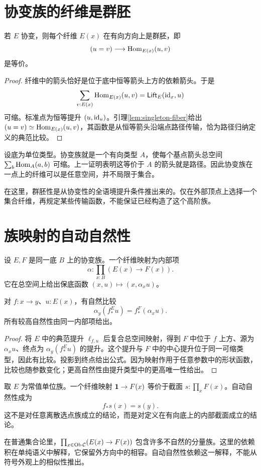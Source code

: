 \section{协变族的纤维是群胚}
\begin{theorem}[纤维群胚性]\label{thm:covariant-groupoid}
若 $E$ 协变，则每个纤维 $E(x)$ 在有向方向上是群胚，即
\[
(u=v)\longrightarrow\operatorname{Hom}_{E(x)}(u,v)
\]
是等价。
\end{theorem}
\begin{proof}
纤维中的箭头恰好是位于底中恒等箭头上方的依赖箭头。于是
\[
\sum_{v:E(x)}\operatorname{Hom}_{E(x)}(u,v)
=\mathsf{Lift}_E(\operatorname{id}_x,u)
\]
可缩。标准点为恒等提升 $(u,\operatorname{id}_u)$。引理\ref{lem:singleton-fiber}给出
$(u=v)\simeq\operatorname{Hom}_{E(x)}(u,v)$，其函数是从恒等箭头沿端点路径传输，恰为路径归纳定义的典范比较。
\end{proof}
\begin{example}
设底为单位类型。协变族就是一个有向类型 $A$，使每个基点箭头总空间 $\sum_b\operatorname{Hom}_A(a,b)$ 可缩。上一证明表明这等价于 $A$ 的箭头就是路径。因此协变族在一点上的纤维可以是任意空间，并不局限于集合。
\end{example}
\begin{remark}
在这里，群胚性是从协变性的全语境提升条件推出来的。仅在外部顶点上选择一个集合纤维，再规定某些传输函数，不能保证已经构造了这个高阶族。
\end{remark}

\section{族映射的自动自然性}
\begin{definition}[纤维映射]
设 $E,F$ 是同一底 $B$ 上的协变族。一个纤维映射为内部项
\[
\alpha:\prod_{x:B}(E(x)\to F(x)).
\]
它在总空间上给出保底函数 $(x,u)\mapsto(x,\alpha_xu)$。
\end{definition}
\begin{theorem}[自动自然性]\label{thm:automatic-naturality}
对 $f:x\to y$、$u:E(x)$，有自然比较
\[
\alpha_y(f_*^E u)=f_*^F(\alpha_xu).
\]
所有较高自然性由同一内部项给出。
\end{theorem}
\begin{proof}
将 $E$ 中的典范提升 $\ell_{f,u}$ 后复合总空间映射，得到 $F$ 中位于 $f$ 上方、源为 $\alpha_xu$、终点为 $\alpha_y(f_*^Eu)$ 的提升。这个提升与 $F$ 中的中心提升位于同一可缩类型，因此有比较。投影到终点给出公式。因为映射作用于任意参数中的形状函数，比较也随参数变化；更高自然性由提升类型中的更高唯一性给出。
\end{proof}
\begin{example}[截面的自然性]
取 $E$ 为常值单位族。一个纤维映射 $\mathbf 1\to F(x)$ 等价于截面 $s:\prod_xF(x)$。自动自然性成为
\[
f_*s(x)=s(y).
\]
这不是对任意离散选点族成立的结论，而是对定义在有向底上的内部截面成立的结论。
\end{example}
\begin{remark}
在普通集合论里，$\prod_{x\in\operatorname{Ob}\mathcal C}(E(x)\to F(x))$ 包含许多不自然的分量族。这里的依赖积在单纯语义中解释，它保留外方向中的相容。自动自然性依赖这一解释，不能从符号外观上的相似性推出。
\end{remark}

